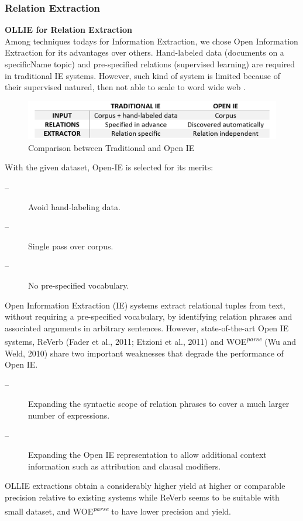 \subsubsection{Relation Extraction}
\textbf{OLLIE for Relation Extraction}\\
Among techniques todays for Information Extraction, we chose Open Information Extraction for its advantages over others.  Hand-labeled data (documents on a specificName topic) and pre-specified relations (supervised learning) are required in traditional IE systems. However, such kind of system is limited because of their supervised natured, then not able to scale to word wide web \parencite{sinamiran_misc}. 
\begin{figure}[h]
\centering
\includegraphics[scale= 0.3]{table_5.png}
\caption{Comparison between Traditional and Open IE}
\end{figure}
With the given dataset, Open-IE is selected for its merits:
\begin{description}
\item[--]Avoid hand-labeling data.
\item[--]Single pass over corpus.
\item[--]No pre-specified vocabulary.
\end{description}
Open Information Extraction (IE) systems extract relational tuples from text, without requiring a pre-specified vocabulary, by identifying relation phrases and associated arguments in arbitrary sentences. However, state-of-the-art Open IE systems, ReVerb (Fader et al., 2011; Etzioni et al., 2011) and WOE\textsuperscript{\textit{parse}} (Wu and Weld, 2010) share two important weaknesses \parencite{schmitz2012open} that degrade the performance of Open IE.
\begin{description}
\item[--]Expanding the syntactic scope of relation phrases to cover a much larger number of expressions.
\item[--]Expanding the Open IE representation to allow additional context information such as attribution and clausal modifiers.
\end{description}
OLLIE extractions obtain a considerably higher yield at higher or comparable precision relative to existing systems while ReVerb seems to be suitable with small dataset, and WOE\textsuperscript{\textit{parse}} to have lower precision and yield.

